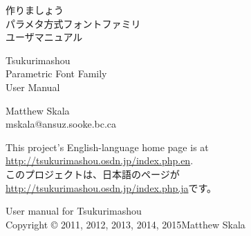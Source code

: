 \documentclass[14pt]{extarticle}
\begin{document}
\pagestyle{plain}\thispagestyle{empty}


\kaku
\begin{center}\LARGE

\vspace*{\fill}


{\Huge 作りましょう~\TsukurimashouVWide}\\
{\huge パラメタ方式フォントファミリ\\
ユーザマニュアル}

\vspace*{0.75in}

{\Huge Tsukurimashou~\TsukurimashouVersion}\\
{\huge Parametric Font Family\\
User Manual}

\vspace*{1.5in}

Matthew Skala\\
mskala@ansuz.sooke.bc.ca\\
\TsukurimashouRDWide\qquad\TsukurimashouReleaseDate

\vspace*{\fill}

\end{center}
\clearpage


\vspace*{\fill}


This project's English-language home page is at\\
\hspace*{1em}\url{http://tsukurimashou.osdn.jp/index.php.en}.\\
このプロジェクトは、日本語のページが\\
\hspace*{1em}\url{http://tsukurimashou.osdn.jp/index.php.ja}です。

\vspace*{1in}

User manual for Tsukurimashou\\
Copyright © 2011, 2012, 2013, 2014, 2015\quad Matthew Skala
\end{document}
